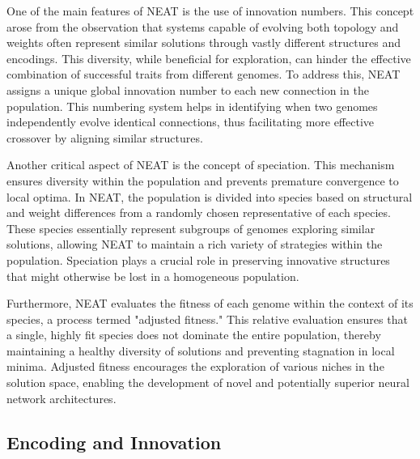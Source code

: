 \documentclass{article}
\begin{document}
One of the main features of NEAT is the use of innovation numbers. This concept arose from the observation that systems
capable of evolving both topology and weights often represent similar solutions through vastly different structures and encodings.
This diversity, while beneficial for exploration, can hinder the effective combination of successful traits from different genomes.
To address this, NEAT assigns a unique global innovation number to each new connection in the population. This numbering system helps 
in identifying when two genomes independently evolve identical connections, thus facilitating more effective crossover by
aligning similar structures. 

Another critical aspect of NEAT is the concept of speciation. This mechanism ensures diversity within the population and prevents
premature convergence to local optima. In NEAT, the population is divided into species based on structural and weight differences
from a randomly chosen representative of each species. These species essentially represent subgroups of genomes exploring similar 
solutions, allowing NEAT to maintain a rich variety of strategies within the population. Speciation plays a crucial role in preserving
innovative structures that might otherwise be lost in a homogeneous population.

Furthermore, NEAT evaluates the fitness of each genome within the context of its species, a process termed "adjusted fitness."
This relative evaluation ensures that a single, highly fit species does not dominate the entire population, thereby maintaining
a healthy diversity of solutions and preventing stagnation in local minima. Adjusted fitness encourages the exploration
of various niches in the solution space, enabling the development of novel and potentially superior neural network architectures.

\subsection{Encoding and Innovation}
\end{document}
